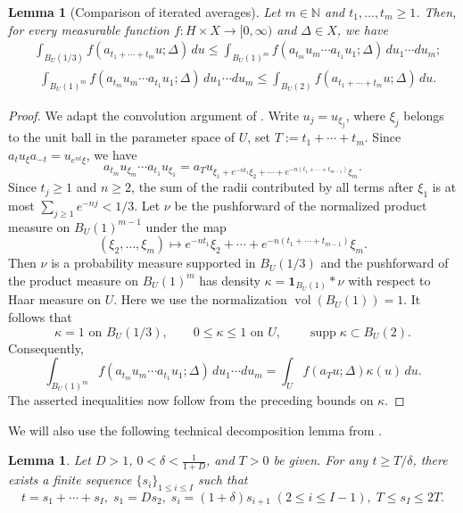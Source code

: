 \documentclass[reqno,11pt]{amsart}
\numberwithin{equation}{section}
\newtheorem{lemma}[theorem]{Lemma}
\theoremstyle{definition}
\theoremstyle{remark}
\begin{document}
\begin{lemma}[Comparison of iterated averages]\label{lem:randomwalkgeneral}
Let $m\in\mathbb N$ and $t_1,\ldots,t_m\ge1$. Then, for every 
measurable function $f:H\times X\to[0,\infty)$ and $\Delta\in X$, we have
\begin{align*}
&\int_{B_{U}(1/3)}
 f(a_{t_1+\cdots+t_m}u;\Delta)\,du \le \int_{B_{U}(1)^m}
 f(a_{t_m}u_m\cdots a_{t_1}u_1;\Delta)
 \,du_1\cdots du_m;
\end{align*}
\begin{align*}
&\int_{B_{U}(1)^m}
 f(a_{t_m}u_m\cdots a_{t_1}u_1;\Delta)
 \,du_1\cdots du_m \le \int_{B_{U}(2)}
 f(a_{t_1+\cdots+t_m}u;\Delta)\,du.
\end{align*}

\end{lemma}
\begin{proof} We adapt the convolution argument of \cite[Lemma~6.1]{Kim}. Write $u_j=u_{\xi_j}$, where $\xi_j$ belongs to the unit ball in the
parameter space of $U$,
set $T:=t_1+\cdots+t_m$. Since
$a_tu_\xi a_{-t}=u_{e^{nt}\xi}$, we have
$$
a_{t_m}u_{\xi_m}\cdots a_{t_1}u_{\xi_1}
=
a_Tu_{\xi_1+e^{-nt_1}\xi_2+\cdots+
e^{-n(t_1+\cdots+t_{m-1})}\xi_m}.
$$
Since $t_j\ge1$ and $n\ge2$, the sum of the radii contributed by all
terms after $\xi_1$ is at most
$\sum_{j\ge1}e^{-nj}<1/3.
$
Let $\nu$ be the pushforward of the normalized product measure on
$B_U(1)^{m-1}$ under the map
$$
(\xi_2,\ldots,\xi_m)
\mapsto
e^{-nt_1}\xi_2+\cdots+
e^{-n(t_1+\cdots+t_{m-1})}\xi_m.
$$
Then $\nu$ is a probability measure supported in $B_U(1/3)$ and the
pushforward of the product measure on $B_U(1)^m$ has density
$\kappa=\mathbf 1_{B_U(1)}*\nu
$
with respect to Haar measure on $U$. Here we use the normalization
$\operatorname{vol}(B_U(1))=1$. It follows that
$$
\kappa=1\text{ on }B_U(1/3),\qquad
0\le\kappa\le1\text{ on }U,\qquad
\operatorname{supp}\kappa\subset B_U(2).
$$
Consequently,
$$
\int_{B_U(1)^m}
f(a_{t_m}u_m\cdots a_{t_1}u_1;\Delta)\,du_1\cdots du_m
=
\int_U f(a_Tu;\Delta)\kappa(u)\,du.
$$
The asserted inequalities now follow from the preceding bounds on
$\kappa$.
\end{proof}


We will also use the following technical decomposition lemma from \cite{Kim}.

\begin{lemma}\cite[Lemma 6.2]{Kim}\label{lem:ndecomposition}
Let $D>1$, $0<\delta<\frac{1}{1+D}$, and $T>0$ be given.
For any $t\ge T/\delta$,
there exists a finite sequence $\{s_i\}_{1\le i\le I}$ such that
$$
t=s_1+\cdots+s_I,\;
s_1=Ds_2,\;
s_i=(1+\delta)s_{i+1}\;  (2\le i\le I-1), \; T\le s_I\le 2T.$$
\end{lemma}
\end{document}
